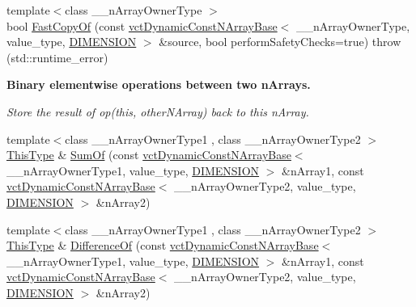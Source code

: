 {\bf }\par
\begin{DoxyCompactItemize}
\item 
{\footnotesize template$<$class \-\_\-\-\_\-n\-Array\-Owner\-Type $>$ }\\bool \hyperlink{classvct_dynamic_n_array_base_a1f4e44b77791a3c1945d4e0f0833e4b0}{Fast\-Copy\-Of} (const \hyperlink{classvct_dynamic_const_n_array_base}{vct\-Dynamic\-Const\-N\-Array\-Base}$<$ \-\_\-\-\_\-n\-Array\-Owner\-Type, value\-\_\-type, \hyperlink{classvct_dynamic_n_array_base_aa66532d28588bdf26d08fb593db815d6abfcde386ec801b212d7c42d63a4f3837}{D\-I\-M\-E\-N\-S\-I\-O\-N} $>$ \&source, bool perform\-Safety\-Checks=true)  throw (std\-::runtime\-\_\-error)
\end{DoxyCompactItemize}

\begin{Indent}{\bf Binary elementwise operations between two n\-Arrays.}\par
{\em Store the result of op(this, other\-N\-Array) back to this n\-Array. }\begin{DoxyCompactItemize}
\item 
{\footnotesize template$<$class \-\_\-\-\_\-n\-Array\-Owner\-Type1 , class \-\_\-\-\_\-n\-Array\-Owner\-Type2 $>$ }\\\hyperlink{classvct_dynamic_const_n_array_base_a5123caffcf1455a1b99003877eade897}{This\-Type} \& \hyperlink{classvct_dynamic_n_array_base_a400251dd48d2a5b85f6fc290d78a18d4}{Sum\-Of} (const \hyperlink{classvct_dynamic_const_n_array_base}{vct\-Dynamic\-Const\-N\-Array\-Base}$<$ \-\_\-\-\_\-n\-Array\-Owner\-Type1, value\-\_\-type, \hyperlink{classvct_dynamic_n_array_base_aa66532d28588bdf26d08fb593db815d6abfcde386ec801b212d7c42d63a4f3837}{D\-I\-M\-E\-N\-S\-I\-O\-N} $>$ \&n\-Array1, const \hyperlink{classvct_dynamic_const_n_array_base}{vct\-Dynamic\-Const\-N\-Array\-Base}$<$ \-\_\-\-\_\-n\-Array\-Owner\-Type2, value\-\_\-type, \hyperlink{classvct_dynamic_n_array_base_aa66532d28588bdf26d08fb593db815d6abfcde386ec801b212d7c42d63a4f3837}{D\-I\-M\-E\-N\-S\-I\-O\-N} $>$ \&n\-Array2)
\item 
{\footnotesize template$<$class \-\_\-\-\_\-n\-Array\-Owner\-Type1 , class \-\_\-\-\_\-n\-Array\-Owner\-Type2 $>$ }\\\hyperlink{classvct_dynamic_const_n_array_base_a5123caffcf1455a1b99003877eade897}{This\-Type} \& \hyperlink{classvct_dynamic_n_array_base_a5eab5f37af9612a9c4aafa4092247291}{Difference\-Of} (const \hyperlink{classvct_dynamic_const_n_array_base}{vct\-Dynamic\-Const\-N\-Array\-Base}$<$ \-\_\-\-\_\-n\-Array\-Owner\-Type1, value\-\_\-type, \hyperlink{classvct_dynamic_n_array_base_aa66532d28588bdf26d08fb593db815d6abfcde386ec801b212d7c42d63a4f3837}{D\-I\-M\-E\-N\-S\-I\-O\-N} $>$ \&n\-Array1, const \hyperlink{classvct_dynamic_const_n_array_base}{vct\-Dynamic\-Const\-N\-Array\-Base}$<$ \-\_\-\-\_\-n\-Array\-Owner\-Type2, value\-\_\-type, \hyperlink{classvct_dynamic_n_array_base_aa66532d28588bdf26d08fb593db815d6abfcde386ec801b212d7c42d63a4f3837}{D\-I\-M\-E\-N\-S\-I\-O\-N} $>$ \&n\-Array2)

\end{DoxyCompactItemize}
\end{Indent}
